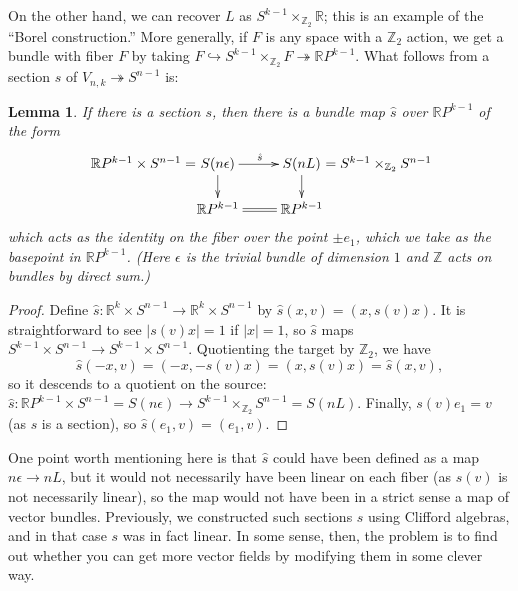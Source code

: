 \documentclass{article}
\newcommand{\Z}{\mathbb{Z}}
\newcommand{\R}{\mathbb{R}}
\newcommand{\RP}{\R P}
\newcommand{\into}{\hookrightarrow}
\newcommand{\onto}{\twoheadrightarrow}
\newtheorem{lem}[thm]{Lemma}
\begin{document}
On the other hand, we can recover $L$ as $S^{k-1} \times_{\Z_2} \R$; this is an example of the ``Borel construction.'' %
More generally, if $F$ is any space with a $\Z_2$ action, we get a bundle with fiber $F$ by taking $F \into S^{k-1} \times_{\Z_2} F \onto \RP^{k-1}$.  What follows from a section $s$ of $V_{n, k} \onto S^{n-1}$ is:
\begin{lem}
If there is a section $s$, then there is a bundle map $\hat s$ over $\RP^{k-1}$ of the form
\[\xymatrix@R=.6cm{
\makebox[0cm][r]{$\RP^{k-1} \times S^{n-1}=$\ }S(n \epsilon)\ar[r]^{\hat s}\ar[d]&
S(nL)\makebox[0cm][l]{\ $=S^{k-1} \times_{\Z_2} S^{n-1}$}\ar[d]\\
\RP^{k-1}\ar@{=}[r]&\RP^{k-1}
}\]
which acts as the identity on the fiber over the point $\pm e_1$, which we take as the basepoint in $\RP^{k-1}$.
(Here $\epsilon$ is the trivial bundle of dimension $1$ and $\Z$ acts on bundles by direct sum.)
\end{lem}
\begin{proof}
Define $\hat s: \R^k \times S^{n-1} \to \R^k \times S^{n-1}$ by $\hat s(x, v) = (x, s(v) x)$.  It is straightforward to see $|s(v) x| = 1$ if $|x| = 1$, so $\hat s$ maps $S^{k-1} \times S^{n-1} \to S^{k-1} \times S^{n-1}$.  Quotienting the target by $\Z_2$, we have \[\hat s(-x, v) = (-x, -s(v)x) = (x, s(v) x) = \hat{s}(x, v),\] so it descends to a quotient on the source: $\hat{s}: \RP^{k-1} \times S^{n-1} = S(n \epsilon) \to S^{k-1} \times_{\Z_2} S^{n-1} = S(nL)$.  Finally, $s(v)e_1 = v$ (as $s$ is a section), so $\hat{s}(e_1, v) = (e_1, v)$.
\end{proof}
One point worth mentioning here is that $\hat s$ could have been defined as a map $n \epsilon \to n L$, but it would not necessarily have been linear on each fiber (as $s(v)$ is not necessarily linear), so the map would not have been in a strict sense a map of vector bundles.  Previously, we constructed such sections $s$ using Clifford algebras, and in that case $s$ was in fact linear.  In some sense, then, the problem is to find out whether you can get more vector fields by modifying them in some clever way.
\end{document}
